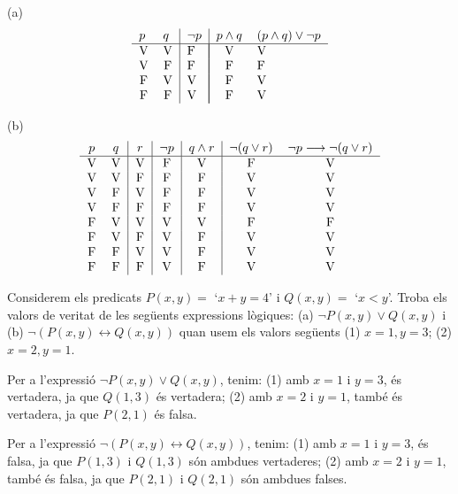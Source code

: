 \begin{solucio}
(a)%
\[%
\begin{tabular}
[c]{ll|l|ll}%
$p$ & $q$ & $\lnot p$ & $p\wedge q$ & $(p\wedge q)\vee\lnot p$\\\hline
\multicolumn{1}{c}{V} & \multicolumn{1}{c|}{V} & F & \multicolumn{1}{|c}{V} &
V\\
\multicolumn{1}{c}{V} & \multicolumn{1}{c|}{F} & F & \multicolumn{1}{|c}{F} &
F\\
\multicolumn{1}{c}{F} & \multicolumn{1}{c|}{V} & V & \multicolumn{1}{|c}{F} &
V\\
\multicolumn{1}{c}{F} & \multicolumn{1}{c|}{F} & V & \multicolumn{1}{|c}{F} &
V
\end{tabular}
\]


(b)%
\[%
\begin{tabular}
[c]{cc|c|c|c|cc}%
$p$ & $q$ & $r$ & $\lnot p$ & $q\wedge r$ & $\lnot(q\vee r)$ & $\lnot
p\longrightarrow\lnot(q\vee r)$\\\hline
V & V & V & F & V & F & V\\
V & V & F & F & F & V & V\\
V & F & V & F & F & V & V\\
V & F & F & F & F & V & V\\
F & V & V & V & V & F & F\\
F & V & F & V & F & V & V\\
F & F & V & V & F & V & V\\
F & F & F & V & F & V & V
\end{tabular}
\]

\end{solucio}

\begin{exercici}
Considerem els predicats $P(x,y)=$ `$x+y=4$' i $Q(x,y)=$ `$x<y$'. Troba els
valors de veritat de les seg\"{u}ents expressions l\`{o}giques: (a) $\lnot
P(x,y)\vee Q(x,y)$ i (b) $\lnot(P(x,y)\longleftrightarrow Q(x,y))$ quan usem
els valors seg\"{u}ents (1) $x=1,y=3$; (2) $x=2,y=1$.
\end{exercici}

\begin{solucio}
Per a l'expressi\'{o} $\lnot P(x,y)\vee Q(x,y)$, tenim:
(1) amb $x=1$ i $y=3$, \'{e}s vertadera, ja que $Q(1,3)$ \'{e}s vertadera;
(2) amb $x=2$ i $y=1$, tamb\'{e} \'{e}s vertadera, ja que $P(2,1)$ \'{e}s falsa.

Per a l'expressi\'{o} $\lnot(P(x,y)\longleftrightarrow Q(x,y))$, tenim:
(1) amb $x=1$ i $y=3$, \'{e}s falsa, ja que $P(1,3)$ i $Q(1,3)$ s\'{o}n
ambdues vertaderes; (2) amb $x=2$ i $y=1$, tamb\'{e} \'{e}s falsa, ja que
$P(2,1)$ i $Q(2,1)$ s\'{o}n ambdues falses.
\end{solucio}

